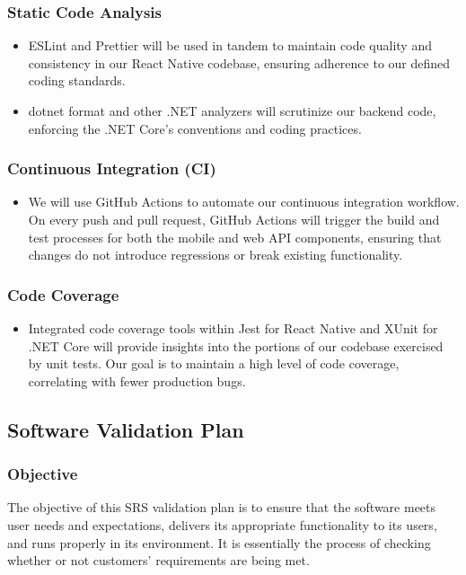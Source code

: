 \documentclass[12pt, titlepage]{article}
\begin{document}
    \subsubsection{Static Code Analysis}
    \begin{itemize}
        \item ESLint and Prettier will be used in tandem to maintain code quality and consistency in our React Native codebase, ensuring adherence to our defined coding standards.
        \item dotnet format and other .NET analyzers will scrutinize our backend code, enforcing the .NET Core's conventions and coding practices.
    \end{itemize}

    \subsubsection{Continuous Integration (CI)}
    \begin{itemize}
        \item We will use GitHub Actions to automate our continuous integration workflow. On every push and pull request, GitHub Actions will trigger the build and test processes for both the mobile and web API components, ensuring that changes do not introduce regressions or break existing functionality.
    \end{itemize}

    \subsubsection{Code Coverage}
    \begin{itemize}
        \item Integrated code coverage tools within Jest for React Native and XUnit for .NET Core will provide insights into the portions of our codebase exercised by unit tests. Our goal is to maintain a high level of code coverage, correlating with fewer production bugs.
    \end{itemize}

    \subsection{Software Validation Plan}

    \subsubsection{Objective}
    The objective of this SRS validation plan is to ensure that the software meets user needs and expectations, delivers its appropriate functionality to its users, and runs properly in its environment. It is essentially the process of checking whether or not customers' requirements are being met.
\end{document}
